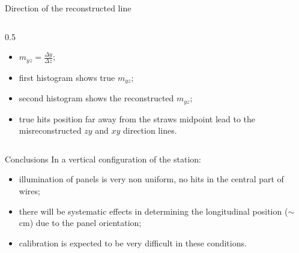 \documentclass{beamer}[10pt]
\begin{document}
\begin{frame}{Direction of the reconstructed line}
\begin{columns}
\begin{column}{0.5\framewidth}
  \begin{itemize}
      
    \item $m_{yz}=\frac{\Delta y}{\Delta z}$;
    \vspace{2mm}
    \item first histogram shows true $m_{yz}$;
    \vspace{2mm}
    \item second histogram shows the reconstructed $m_{yz}$;
    \vspace{2mm}
    \item true hits position far away from the straws midpoint lead to the misreconstructed $zy$ and $xy$ direction lines.
  \end{itemize}
\end{column}
\end{columns}
\end{frame}


\begin{frame}{Conclusions}
  In a vertical configuration of the station:
  \vspace{6mm}
  \begin{itemize}
    \item illumination of panels is very non uniform, no hits in the central part of wires;
    \vspace{4mm}
    \item there will be systematic effects in determining the longitudinal position ($\sim$ cm) due to the panel orientation;
    \vspace{4mm}
    \item calibration is expected to be very difficult in these conditions.
  \end{itemize}
\end{frame}
\end{document}
